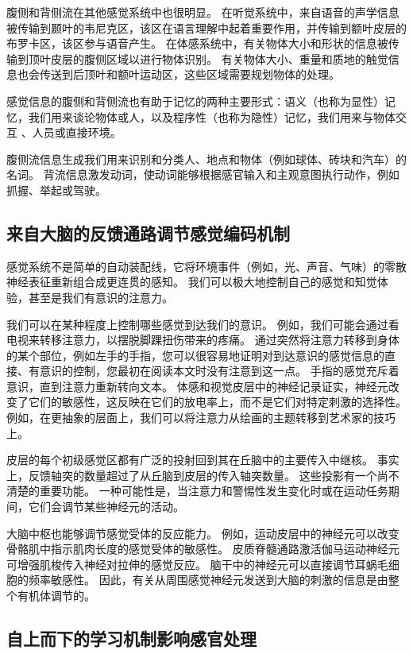腹侧和背侧流在其他感觉系统中也很明显。 
在听觉系统中，来自语音的声学信息被传输到颞叶的韦尼克区，该区在语言理解中起着重要作用，并传输到额叶皮层的布罗卡区，该区参与语音产生。 
在体感系统中，有关物体大小和形状的信息被传输到顶叶皮层的腹侧区域以进行物体识别。 
有关物体大小、重量和质地的触觉信息也会传送到后顶叶和额叶运动区，这些区域需要规划物体的处理。


感觉信息的腹侧和背侧流也有助于记忆的两种主要形式：语义（也称为显性）记忆，我们用来谈论物体或人，以及程序性（也称为隐性）记忆，我们用来与物体交互 、人员或直接环境。


腹侧流信息生成我们用来识别和分类人、地点和物体（例如球体、砖块和汽车）的名词。 
背流信息激发动词，使动词能够根据感官输入和主观意图执行动作，例如抓握、举起或驾驶。


\subsection{来自大脑的反馈通路调节感觉编码机制}

感觉系统不是简单的自动装配线，它将环境事件（例如，光、声音、气味）的零散神经表征重新组合成更连贯的感知。 
我们可以极大地控制自己的感觉和知觉体验，甚至是我们有意识的注意力。


我们可以在某种程度上控制哪些感觉到达我们的意识。 
例如，我们可能会通过看电视来转移注意力，以摆脱脚踝扭伤带来的疼痛。 
通过突然将注意力转移到身体的某个部位，例如左手的手指，您可以很容易地证明对到达意识的感觉信息的直接、有意识的控制，您最初在阅读本文时没有注意到这一点。 
手指的感觉充斥着意识，直到注意力重新转向文本。 
体感和视觉皮层中的神经记录证实，神经元改变了它们的敏感性，这反映在它们的放电率上，而不是它们对特定刺激的选择性。 
例如，在更抽象的层面上，我们可以将注意力从绘画的主题转移到艺术家的技巧上。


皮层的每个初级感觉区都有广泛的投射回到其在丘脑中的主要传入中继核。 
事实上，反馈轴突的数量超过了从丘脑到皮层的传入轴突数量。 
这些投影有一个尚不清楚的重要功能。 
一种可能性是，当注意力和警惕性发生变化时或在运动任务期间，它们会调节某些神经元的活动。


大脑中枢也能够调节感觉受体的反应能力。 
例如，运动皮层中的神经元可以改变骨骼肌中指示肌肉长度的感觉受体的敏感性。 
皮质脊髓通路激活伽马运动神经元可增强肌梭传入神经对拉伸的感觉反应。 
脑干中的神经元可以直接调节耳蜗毛细胞的频率敏感性。 
因此，有关从周围感觉神经元发送到大脑的刺激的信息是由整个有机体调节的。


\subsection{自上而下的学习机制影响感官处理}

